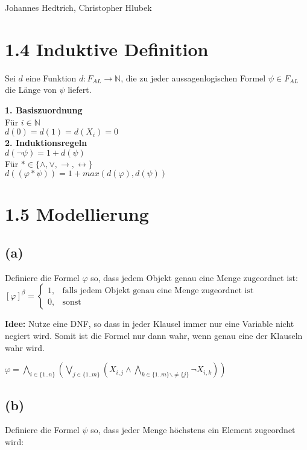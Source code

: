 \documentclass[12pt,a4paper]{scrartcl}
\title{}
\author{Johannes Hedtrich, Christopher Hlubek}
\date{\today}
\begin{document}
Johannes Hedtrich, Christopher Hlubek\\
\section*{1.4 Induktive Definition}
Sei $d$ eine Funktion $d: F_{AL} \rightarrow \mathbb{N}$, die zu jeder aussagenlogischen Formel $\psi \in F_{AL}$ die Länge von $\psi$ liefert.

\noindent
\textbf{1. Basiszuordnung}\\
Für $i \in \mathbb{N}$\\
$d(0) = d(1) = d(X_i) = 0$\\
\textbf{2. Induktionsregeln}\\
$d(\neg\psi) = 1 + d(\psi)$\\
Für $\ast \in \{\wedge, \vee, \rightarrow,\leftrightarrow \}$\\
$d((\varphi \ast \psi)) = 1 + max(d(\varphi), d(\psi))$

\section*{1.5 Modellierung}

\subsection*{(a)}
Definiere die Formel $\varphi$ so, dass jedem Objekt genau eine Menge zugeordnet ist:\\

$[\varphi]^{\beta} = 
\begin{cases}
1, & {\textrm{falls jedem Objekt genau eine Menge zugeordnet ist}}\\
0, & {\textrm{sonst}}
\end{cases}
$

\textbf{Idee:} Nutze eine DNF, so dass in jeder Klausel immer nur eine Variable nicht negiert wird. Somit ist die Formel nur dann wahr, wenn genau eine der Klauseln wahr wird.

$\varphi = \bigwedge_{i \in \{1..n\}}(\bigvee_{j \in \{1..m\}}(X_{i,j} \wedge \bigwedge_{k \in \{1..m\} \backslash \neq \{j\}} \neg X_{i,k}))$

\subsection*{(b)}
Definiere die Formel $\psi$ so, dass jeder Menge höchstens ein Element zugeordnet wird:\\
\end{document}
